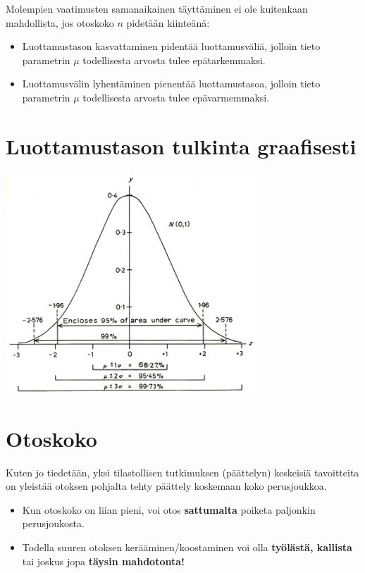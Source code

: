 \documentclass[
]{report}
\begin{document}
Molempien vaatimusten samanaikainen täyttäminen ei ole kuitenkaan
mahdollista, jos otoskoko \(n\) pidetään kiinteänä:

\begin{itemize}
\item
  Luottamustason kasvattaminen pidentää luottamusväliä, jolloin tieto
  parametrin \(\mu\) todellisesta arvosta tulee epätarkemmaksi.
\item
  Luottamusvälin lyhentäminen pienentää luottamustasoa, jolloin tieto
  parametrin \(\mu\) todellisesta arvosta tulee epävarmemmaksi.
\end{itemize}

\hypertarget{luottamustason-tulkinta-graafisesti}{%
\section{Luottamustason tulkinta
graafisesti}\label{luottamustason-tulkinta-graafisesti}}

\includegraphics[width=3.6875in,height=\textheight]{gaussian-distribution.jpg}

\hypertarget{otoskoko}{%
\section{Otoskoko}\label{otoskoko}}

Kuten jo tiedetään, yksi tilastollisen tutkimuksen (päättelyn) keskeisiä
tavoitteita on yleistää otoksen pohjalta tehty päättely koskemaan koko
perusjoukkoa.

\begin{itemize}
\item
  Kun otoskoko on liian pieni, voi otos \textbf{sattumalta} poiketa
  paljonkin perusjoukosta.
\item
  Todella suuren otoksen kerääminen/koostaminen voi olla
  \textbf{työlästä, kallista} tai joskus jopa \textbf{täysin
  mahdotonta!}
\end{itemize}
\end{document}
